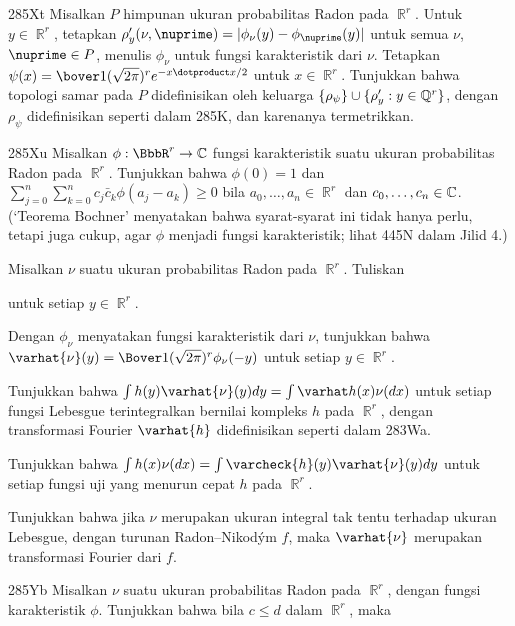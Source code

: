 {\spheader 285Xt Misalkan $P$ himpunan ukuran probabilitas Radon pada
$\BbbR^r$. Untuk $y\in\BbbR^r$, tetapkan
$\rho'_y(\nu,\nuprime)=|\phi_{\nu}(y)-\phi_{\nuprime}(y)|$ untuk semua $\nu$,
$\nuprime\in P$, menulis $\phi_{\nu}$ untuk fungsi karakteristik dari
$\nu$. Tetapkan $\psi(x)=\bover1{(\sqrt{2\pi})^r}e^{-x\dotproduct x/2}$ untuk
$x\in\BbbR^r$. Tunjukkan bahwa topologi samar pada $P$ didefinisikan oleh
keluarga $\{\rho_{\psi}\}\cup\{\rho'_y:y\in\Bbb Q^r\}$, dengan
$\rho_{\psi}$ didefinisikan seperti dalam 285K, dan karenanya termetrikkan.

\sqheader 285Xu
Misalkan $\phi:\BbbR^r\to\Bbb C$ fungsi karakteristik suatu ukuran
probabilitas Radon pada $\BbbR^r$. Tunjukkan bahwa $\phi(0)=1$ dan
$\sum_{j=0}^n\sum_{k=0}^nc_j\bar c_k\phi(a_j-a_k)\ge 0$ bila
$a_0,\ldots,a_n\in\BbbR^r$ dan $c_0,\ldots,c_n\in\Bbb C$. (`Teorema
Bochner' menyatakan bahwa syarat-syarat ini tidak hanya perlu, tetapi juga cukup,
agar $\phi$ menjadi fungsi karakteristik; lihat 445N dalam Jilid 4.)

Misalkan $\nu$ suatu ukuran probabilitas Radon pada $\BbbR^r$. Tuliskan


\noindent untuk setiap $y\in\BbbR^r$.

 Dengan $\phi_{\nu}$ menyatakan fungsi karakteristik dari
$\nu$, tunjukkan bahwa $\varhat{\nu}(y)
=\Bover1{(\sqrt{2\pi})^r}\phi_{\nu}(-y)$ untuk setiap $y\in\BbbR^r$.

 Tunjukkan bahwa
$\int h(y)\varhat{\nu}(y)dy=\int\varhat h(x)\nu(dx)$
untuk setiap fungsi Lebesgue terintegralkan bernilai kompleks $h$ pada
$\BbbR^r$, dengan transformasi Fourier $\varhat{h}$ didefinisikan seperti
dalam 283Wa.

 Tunjukkan bahwa $\int h(x)\nu(dx)
=\int\varcheck{h}(y)\varhat{\nu}(y)dy$ untuk setiap fungsi uji yang menurun
cepat $h$ pada $\BbbR^r$.

 Tunjukkan bahwa jika $\nu$ merupakan ukuran integral tak tentu
terhadap ukuran Lebesgue, dengan turunan Radon--Nikod\'ym $f$, maka
$\varhat{\nu}$ merupakan transformasi Fourier dari $f$.

\spheader 285Yb Misalkan $\nu$ suatu ukuran probabilitas Radon pada $\BbbR^r$,
dengan fungsi karakteristik $\phi$. Tunjukkan bahwa bila $c\le d$ dalam
$\BbbR^r$, maka

}
